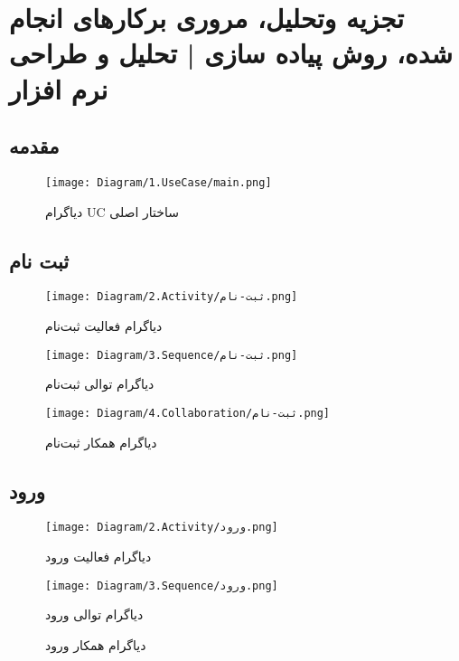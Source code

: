 \chapter{تجزیه وتحلیل، مروری برکارهای انجام شده، روش پیاده سازی | تحلیل و طراحی نرم افزار}
\section*{مقدمه}

\begin{figure}[htbp]
	\centering
	\texttt{[image: Diagram/1.UseCase/main.png]}
	\caption{دیاگرام UC ساختار اصلی}
	\label{fig:uc:main}
\end{figure}


\section{‌ثبت نام}

\begin{figure}[htbp]
	\centering
	\texttt{[image: Diagram/2.Activity/ثبت-نام.png]}
	\caption{دیاگرام فعالیت ثبت‌نام}
	\label{fig:a-ثبت-نام}
\end{figure}
\begin{figure}[htbp]
\centering
\texttt{[image: Diagram/3.Sequence/ثبت-نام.png]}
\caption{دیاگرام توالی ثبت‌نام}
\label{fig:s-ثبت-نام}
\end{figure}
\begin{figure}[htbp]
\centering
\texttt{[image: Diagram/4.Collaboration/ثبت-نام.png]}
\caption{دیاگرام همکار ثبت‌نام}
\label{fig:c-ثبت-نام}
\end{figure}

\section{ورود}

\begin{figure}[htbp]
	\centering
	\texttt{[image: Diagram/2.Activity/ورود.png]}
	\caption{دیاگرام فعالیت ورود}
	\label{fig:a-ورود}
\end{figure}
\begin{figure}[htbp]
	\centering
	\texttt{[image: Diagram/3.Sequence/ورود.png]}
	\caption{دیاگرام توالی ورود}
	\label{fig:s-ورود}
\end{figure}
\begin{figure}[htbp]
	\centering
	\caption{دیاگرام همکار ورود}
	\label{fig:c-ورود}
\end{figure}

